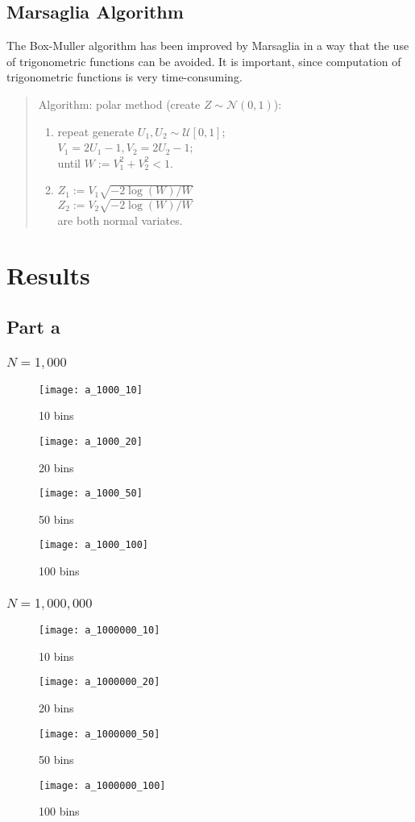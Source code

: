 \documentclass[a4paper]{article}
\begin{document}
	\subsection{Marsaglia Algorithm}
	The Box-Muller algorithm has been improved by Marsaglia in a way that the use of trigonometric functions can be avoided. It is important, since computation of trigonometric functions is very time-consuming.
	\begin{quote}
		Algorithm: polar method (create $Z \sim \mathcal{N}(0, 1)$):
		\begin{enumerate}
			\item repeat generate $U_1, U_2 \sim \mathcal{U}[0,1]$; \\
					$V_1 =2U_1 - 1, V_2 = 2 U_2 -1$; \\
					until $W:=V_1^{2} + V_2^{2} < 1$.
			\item $Z_1 := V_1\sqrt{-2\log(W)/W}$ \\
					$Z_2 := V_2\sqrt{-2\log(W)/W}$ \\
					are both normal variates.
		\end{enumerate}
	\end{quote}
	\newpage
	\section{Results}
	\subsection{Part a}
	\subsubsection{$N = 1,000$}
	\begin{figure}[H]
		\centering
		\texttt{[image: a\_1000\_10]}
		\caption{10 bins}	
		\label{a_3_10}
		\texttt{[image: a\_1000\_20]}
		\caption{20 bins}	
		\label{a_3_20}
	\end{figure}
	\newpage
	\begin{figure}[H]
		\centering
		\texttt{[image: a\_1000\_50]}
		\caption{50 bins}	
		\label{a_3_50}
		\centering
		\texttt{[image: a\_1000\_100]}
		\caption{100 bins}	
		\label{a_3_100}
	\end{figure}
	\newpage
	\subsubsection{$N = 1,000,000$}
	\begin{figure}[H]
		\centering
		\texttt{[image: a\_1000000\_10]}
		\caption{10 bins}	
		\label{a_6_10}
		\texttt{[image: a\_1000000\_20]}
		\caption{20 bins}	
		\label{a_6_20}
	\end{figure}
	\newpage
	\begin{figure}[H]
		\centering
		\texttt{[image: a\_1000000\_50]}
		\caption{50 bins}	
		\label{a_6_50}
		\texttt{[image: a\_1000000\_100]}
		\caption{100 bins}	
		\label{a_6_100}
	\end{figure}
\end{document}
